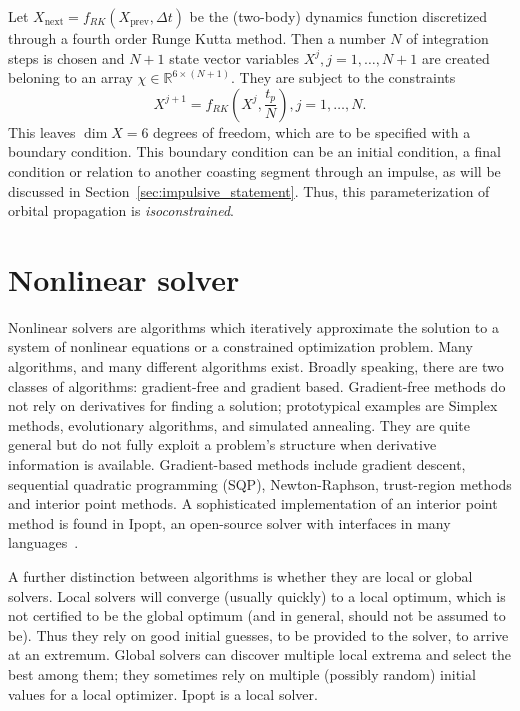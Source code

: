 Let \(X_{\text{next}} = f_{RK}(X_{\text{prev}}, \Delta t)\) be the (two-body) dynamics function discretized through a fourth order Runge Kutta method. Then a number \(N\) of integration steps is chosen and \(N+1\) state vector variables \(X^j, j=1,\dots,N+1\) are created beloning to an array \(\chi \in \mathbb{R}^{6 \times (N+1)}\). They are subject to the constraints
\begin{equation}
    X^{j+1} = f_{RK}(X^j, \frac{t_p}{N}), j = 1, \dots, N.
\end{equation}
This leaves \(\dim X = 6\) degrees of freedom, which are to be specified with a boundary condition. This boundary condition can be an initial condition, a final condition or relation to another coasting segment through an impulse, as will be discussed in Section~\ref{sec:impulsive_statement}. Thus, this parameterization of orbital propagation is \textit{isoconstrained}.

\section{Nonlinear solver}

Nonlinear solvers are algorithms which iteratively approximate the solution to a system of nonlinear equations or a constrained optimization problem. Many algorithms, and many different algorithms exist. Broadly speaking, there are two classes of algorithms: gradient-free and gradient based. Gradient-free methods do not rely on derivatives for finding a solution; prototypical examples are Simplex methods, evolutionary algorithms, and simulated annealing. They are quite general but do not fully exploit a problem's structure when derivative information is available. Gradient-based methods include gradient descent, sequential quadratic programming (SQP), Newton-Raphson, trust-region methods and interior point methods. A sophisticated implementation of an interior point method is found in Ipopt, an open-source solver with interfaces in many languages~\cite{ipopt}.

A further distinction between algorithms is whether they are local or global solvers. Local solvers will converge (usually quickly) to a local optimum, which is not certified to be the global optimum (and in general, should not be assumed to be). Thus they rely on good initial guesses, to be provided to the solver, to arrive at an extremum. Global solvers can discover multiple local extrema and select the best among them; they sometimes rely on multiple (possibly random) initial values for a local optimizer. Ipopt is a local solver.

